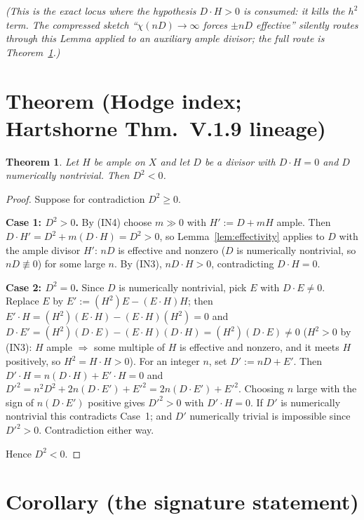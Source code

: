 \documentclass[11pt]{article}
\newtheorem{theorem}{Theorem}[section]
\theoremstyle{definition}
\theoremstyle{remark}
\begin{document}
\noindent\emph{(This is the exact locus where the hypothesis $D \cdot H > 0$ is consumed:
it kills the $h^2$ term. The compressed sketch ``$\chi(nD) \to \infty$ forces $\pm nD$
effective'' silently routes through this Lemma applied to an auxiliary ample divisor; the
full route is Theorem~\ref{thm:hodge}.)}

\section{Theorem (Hodge index; Hartshorne Thm.~V.1.9 lineage)}
\label{sec:hodge}

\begin{theorem}
\label{thm:hodge}
Let $H$ be ample on $X$ and let $D$ be a divisor with $D \cdot H = 0$ and $D$ numerically
nontrivial. Then $D^2 < 0$.
\end{theorem}

\begin{proof}
Suppose for contradiction $D^2 \ge 0$.

\textbf{Case 1: $D^2 > 0$.} By (IN4) choose $m \gg 0$ with $H' := D + mH$ ample. Then
$D \cdot H' = D^2 + m (D \cdot H) = D^2 > 0$, so Lemma~\ref{lem:effectivity} applies to $D$
with the ample divisor $H'$: $nD$ is effective and nonzero ($D$ is numerically nontrivial,
so $nD \not\equiv 0$) for some large $n$. By (IN3), $nD \cdot H > 0$, contradicting
$D \cdot H = 0$.

\textbf{Case 2: $D^2 = 0$.} Since $D$ is numerically nontrivial, pick $E$ with
$D \cdot E \ne 0$. Replace $E$ by $E' := (H^2) E - (E \cdot H) H$; then
$E' \cdot H = (H^2)(E \cdot H) - (E \cdot H)(H^2) = 0$ and
$D \cdot E' = (H^2)(D \cdot E) - (E \cdot H)(D \cdot H) = (H^2)(D \cdot E) \ne 0$
($H^2 > 0$ by (IN3): $H$ ample $\Rightarrow$ some multiple of $H$ is effective and nonzero,
and it meets $H$ positively, so $H^2 = H \cdot H > 0$). For an integer $n$, set
$D' := nD + E'$. Then $D' \cdot H = n (D \cdot H) + E' \cdot H = 0$ and
$D'^2 = n^2 D^2 + 2n (D \cdot E') + E'^2 = 2n (D \cdot E') + E'^2$. Choosing $n$ large with
the sign of $n (D \cdot E')$ positive gives $D'^2 > 0$ with $D' \cdot H = 0$. If $D'$ is
numerically nontrivial this contradicts Case~1; and $D'$ numerically trivial is impossible
since $D'^2 > 0$. Contradiction either way.

Hence $D^2 < 0$.
\end{proof}

\section{Corollary (the signature statement)}
\label{sec:signature}
\end{document}

